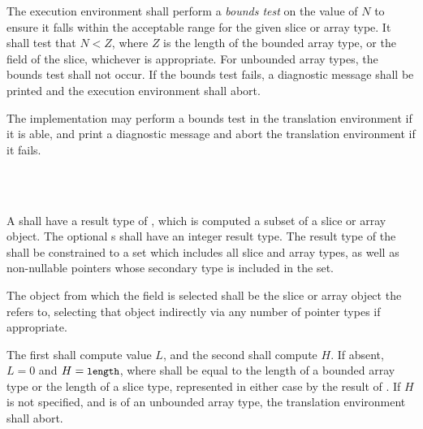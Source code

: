 \specsubsubitem
The execution environment shall perform a \textit{bounds test} on the value of
$N$ to ensure it falls within the acceptable range for the given slice or array
type. It shall test that $N < Z$, where $Z$ is the length of the bounded array
type, or the  field of the slice, whichever is appropriate.  For
unbounded array types, the bounds test shall not occur. If the bounds test
fails, a diagnostic message shall be printed and the execution environment
shall abort.

The implementation may perform a bounds test in the translation environment if
it is able, and print a diagnostic message and abort the translation environment
if it fails.


\begin{grammar}
 \\
	 \terminal{[}    \terminal{]} \\
\end{grammar}

\specsubsubitem
A  shall have a result type of
, which is computed a subset of a slice or array object.
The optional s shall have an integer result type. The
result type of the  shall be constrained to
a set which includes all slice and array types, as well as non-nullable pointers
whose secondary type is included in the set.


\specsubsubitem
The object from which the field is selected shall be the slice or array object
the  refers to, selecting that object indirectly
via any number of pointer types if appropriate.

\specsubsubitem
The first  shall compute value $L$, and the second shall
compute $H$. If absent, $L = 0$ and $H = \mbox{\textup{\small\texttt{length}}}$, where 
shall be equal to the length of a bounded array type or the length of a slice
type, represented in either case by the result of
. If $H$ is not specified, and
 is of an unbounded array type, the translation
environment shall abort.

